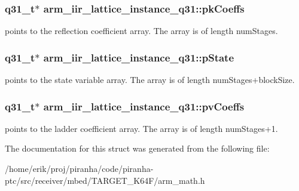 \subsubsection[{\texorpdfstring{pk\+Coeffs}{pkCoeffs}}]{\setlength{\rightskip}{0pt plus 5cm}q31\+\_\+t$\ast$ arm\+\_\+iir\+\_\+lattice\+\_\+instance\+\_\+q31\+::pk\+Coeffs}\hypertarget{structarm__iir__lattice__instance__q31_a1d30aa16aac7722936ea9dee59211863}{}\label{structarm__iir__lattice__instance__q31_a1d30aa16aac7722936ea9dee59211863}
points to the reflection coefficient array. The array is of length num\+Stages. 
\subsubsection[{\texorpdfstring{p\+State}{pState}}]{\setlength{\rightskip}{0pt plus 5cm}q31\+\_\+t$\ast$ arm\+\_\+iir\+\_\+lattice\+\_\+instance\+\_\+q31\+::p\+State}\hypertarget{structarm__iir__lattice__instance__q31_a941282745effd26a889fbfadf4b95e6a}{}\label{structarm__iir__lattice__instance__q31_a941282745effd26a889fbfadf4b95e6a}
points to the state variable array. The array is of length num\+Stages+block\+Size. 
\subsubsection[{\texorpdfstring{pv\+Coeffs}{pvCoeffs}}]{\setlength{\rightskip}{0pt plus 5cm}q31\+\_\+t$\ast$ arm\+\_\+iir\+\_\+lattice\+\_\+instance\+\_\+q31\+::pv\+Coeffs}\hypertarget{structarm__iir__lattice__instance__q31_a04507e2b982b1dfa97b7b55752dea6b9}{}\label{structarm__iir__lattice__instance__q31_a04507e2b982b1dfa97b7b55752dea6b9}
points to the ladder coefficient array. The array is of length num\+Stages+1. 

The documentation for this struct was generated from the following file\+:\begin{DoxyCompactItemize}
\item 
/home/erik/proj/piranha/code/piranha-\/ptc/src/receiver/mbed/\+T\+A\+R\+G\+E\+T\+\_\+\+K64\+F/arm\+\_\+math.\+h\end{DoxyCompactItemize}
